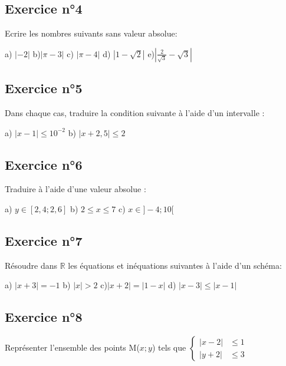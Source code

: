 \documentclass[12pt,a4paper]{article}
\begin{document}
\subsection*{Exercice n°4}

Ecrire les nombres suivants sans valeur absolue:


a) $|-2|$\qquad
b)$|\pi - 3|$\qquad
c) $|\pi -4|$\qquad
d) $|1-\sqrt 2|$\qquad
e)$\displaystyle\left|\frac 2{\sqrt 3}-\sqrt 3\right|$ 


\subsection*{Exercice n°5}
Dans chaque cas, traduire la condition suivante à l'aide d'un intervalle :

a) $|x-1|\leqslant 10^{-2}$ \qquad  b) $|x+2,5|\leqslant 2$

\subsection*{Exercice n°6}
Traduire à l'aide d'une valeur absolue :


a) $y\in [2,4;2,6]$\qquad 
         b) $2\leqslant x \leqslant 7$ \qquad  c) $x\in ]-4;10[$

\subsection*{Exercice n°7}

Résoudre dans $\mathbb{R}$ les équations et inéquations suivantes à l'aide d'un schéma:

 a) $|x+3|=-1$  \qquad b) $|x|>2$ \qquad c)$|x+2|=|1-x|$  \qquad d) $|x-3|\leqslant |x-1|$

\subsection*{Exercice n°8}

   Représenter l'ensemble des points M($x;y$) tels que $
        \left\{
        \begin{array}{rl}
        |x-2| & \leqslant 1 \\
        |y+2| & \leqslant 3
        \end{array}
        \right.$
\end{document}
